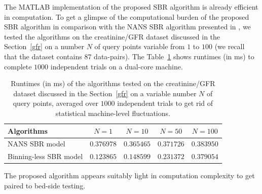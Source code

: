 \documentclass[10pt,final]{siamltex}
\begin{document}
\begin{appendix}
The MATLAB implementation of the proposed SBR algorithm is already efficient in computation. To get a glimpse of the computational burden of the proposed SBR algorithm in comparison with the NANS SBR algorithm presented in \cite{fiori}, we tested the algorithms on the creatinine/GFR dataset discussed in the Section~\ref{gfr} on a number $N$ of query points variable from $1$ to $100$ (we recall that the dataset contains $87$ data-pairs). The Table~\ref{timestats} shows runtimes (in ms) to complete $1000$ independent trials on a dual-core machine.
%
\begin{table}[ht]
  \centering
  \begin{tabular}{|l|c|c|c|c|}
    \hline
    \textbf{Algorithms}             &$N=1$ &$N=10$  &$N=50$  &$N=100$ \\
    \hline
    NANS SBR model                  &$0.376978$  &$0.365465$  &$0.371726$  &$0.383950$  \\
    Binning-less SBR model           &$0.123865$  &$0.148599$  &$0.231372$  &$0.379054$  \\
    \hline
  \end{tabular}
  \caption{Runtimes (in ms) of the algorithms tested on the creatinine/GFR dataset discussed in the Section~\ref{gfr} on a variable number $N$ of query points, averaged over $1000$ independent trials to get rid of statistical machine-level fluctuations.}
  \label{timestats}
\end{table}
%

The proposed algorithm appears suitably light in computation complexity to get paired to bed-side testing.
\end{appendix}
\end{document}
